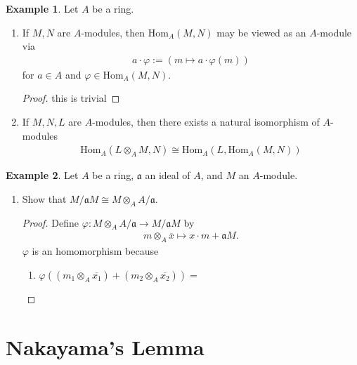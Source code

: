 \documentclass[a4paper]{book}
\theoremstyle{definition}
\newtheorem{example}{Example}[definition]
\begin{document}
\begin{example}
    Let \(A\) be a ring.
    \begin{enumerate}
        \item If \(M, N\) are \(A\)-modules, then \(\mathrm{Hom}_A(M, N)\) may be viewed as an \(A\)-module via
        \begin{align*}
            a \cdot \varphi := (m \mapsto a \cdot \varphi(m))
        \end{align*}
        for \(a \in A\) and \(\varphi \in \mathrm{Hom}_A(M, N)\).

        \begin{proof}
            this is trivial
        \end{proof}
        \item If \(M, N, L\) are \(A\)-modules, then there exists a natural isomorphism of \(A\)-modules
        \begin{align*}
            \mathrm{Hom}_A(L \otimes_A M, N) \cong \mathrm{Hom}_A(L, \mathrm{Hom}_A(M, N))
        \end{align*}
    \end{enumerate}
\end{example}

\begin{example}
    Let \(A\) be a ring, \(\mathfrak{a}\) an ideal of \(A\), and \(M\) an \(A\)-module.
    \begin{enumerate}
        \item Show that \(M / \mathfrak{a} M \cong M \otimes_A A / \mathfrak{a}\).
        \begin{proof}
            Define \(\varphi: M \otimes_A A / \mathfrak{a} \rightarrow M / \mathfrak{a}M \) by
            \begin{align*}
                m \otimes_A \overline{x} \mapsto x \cdot m + \mathfrak{a}M \text{.}
            \end{align*}
            \(\varphi\) is an homomorphism because
            \begin{enumerate}
                \item \(\varphi((m_1 \otimes_A \overline{x_1}) + (m_2 \otimes_A \overline{x_2})) = \)
            \end{enumerate}
        \end{proof}
    \end{enumerate}
\end{example}

\chapter{Nakayama's Lemma}
\end{document}
